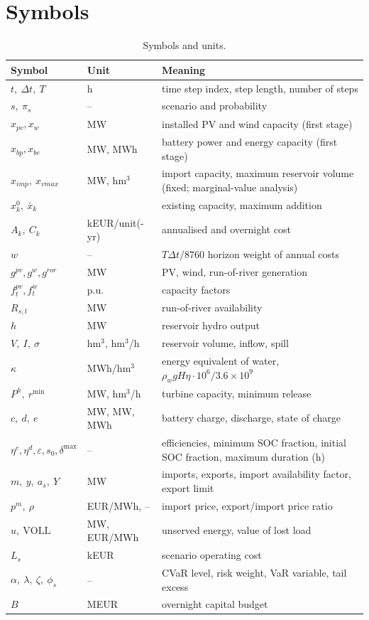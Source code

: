 \FloatBarrier
\section{Symbols}
\label{app:symbols}
\begin{table}[htbp]\centering\footnotesize
\caption{Symbols and units.}
\begin{tabular}{llp{9cm}}
\toprule
Symbol & Unit & Meaning \\
\midrule
$t,\ \Delta t,\ T$ & h & time step index, step length, number of steps \\
$s,\ \pi_s$ & -- & scenario and probability \\
$x_{pv},x_w$ & MW & installed PV and wind capacity (first stage) \\
$x_{bp},x_{be}$ & MW, MWh & battery power and energy capacity (first stage) \\
$x_{imp},\ x_{vmax}$ & MW, hm$^3$ & import capacity, maximum reservoir volume (fixed; marginal-value analysis) \\
$x^0_k,\ \bar x_k$ & & existing capacity, maximum addition \\
$A_k,\ C_k$ & kEUR/unit(-yr) & annualised and overnight cost \\
$w$ & -- & $T\Delta t/8760$ horizon weight of annual costs \\
$g^{pv},g^w,g^{ror}$ & MW & PV, wind, run-of-river generation \\
$f^{pv}_t,f^w_t$ & p.u. & capacity factors \\
$R_{s,t}$ & MW & run-of-river availability \\
$h$ & MW & reservoir hydro output \\
$V,\ I,\ \sigma$ & hm$^3$, hm$^3$/h & reservoir volume, inflow, spill \\
$\kappa$ & MWh/hm$^3$ & energy equivalent of water, $\rho_w g H\eta\cdot10^6/3.6\times10^9$ \\
$P^h,\ r^{\min}$ & MW, hm$^3$/h & turbine capacity, minimum release \\
$c,\ d,\ e$ & MW, MW, MWh & battery charge, discharge, state of charge \\
$\eta^c,\eta^d,\varepsilon,s_0,\delta^{\max}$ & -- & efficiencies, minimum SOC fraction, initial SOC fraction, maximum duration (h) \\
$m,\ y,\ a_s,\ Y$ & MW & imports, exports, import availability factor, export limit \\
$p^m,\ \rho$ & EUR/MWh, -- & import price, export/import price ratio \\
$u,\ \mathrm{VOLL}$ & MW, EUR/MWh & unserved energy, value of lost load \\
$L_s$ & kEUR & scenario operating cost \\
$\alpha,\ \lambda,\ \zeta,\ \phi_s$ & -- & CVaR level, risk weight, VaR variable, tail excess \\
$B$ & MEUR & overnight capital budget \\
\bottomrule
\end{tabular}
\end{table}

